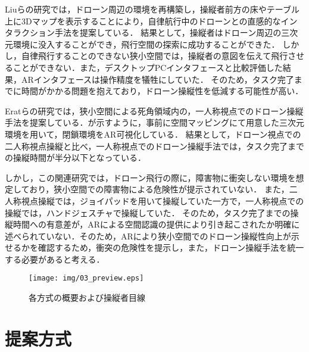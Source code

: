 \documentclass[submit, sigrecommended]{ipsj}
\begin{document}
Liuらの研究\cite{book-ar04}では，ドローン周辺の環境を再構築し，操縦者前方の床やテーブル上に3Dマップを表示することにより，自律航行中のドローンとの直感的なインタラクション手法を提案している．
結果として，操縦者はドローン周辺の三次元環境に没入することができ，飛行空間の探索に成功することができた．
しかし，自律飛行することのできない狭小空間では，操縦者の意図を伝えて飛行させることができない．また，デスクトップPCインタフェースと比較評価した結果，ARインタフェースは操作精度を犠牲にしていた．
そのため，タスク完了までに時間がかかる問題を抱えており，ドローン操縦性を低減する可能性が高い．

Eratらの研究\cite{article-ar05}では，狭小空間による死角領域内の，一人称視点でのドローン操縦手法を提案している．が示すように，事前に空間マッピングにて用意した三次元環境を用いて，閉鎖環境をAR可視化している．
結果として，ドローン視点での二人称視点操縦と比べ，一人称視点でのドローン操縦手法では，タスク完了までの操縦時間が半分以下となっている．

しかし，この関連研究では，ドローン飛行の際に，障害物に衝突しない環境を想定しており，狭小空間での障害物による危険性が提示されていない．
また，二人称視点操縦では，ジョイパッドを用いて操縦していた一方で，一人称視点での操縦では，ハンドジェスチャで操縦していた．
そのため，タスク完了までの操縦時間への有意差が，ARによる空間認識の提供により引き起こされたか明確に述べられていない．そのため，ARにより狭小空間でのドローン操縦性向上が示せるかを確認するため，衝突の危険性を提示し，また，ドローン操縦手法を統一する必要があると考える．


\begin{figure*}[!tb]
  \centering
  \texttt{[image: img/03\_preview.eps]}
  \caption{各方式の概要および操縦者目線}
  \label{fig:03_preview}
\end{figure*}



\section{提案方式}
\end{document}
